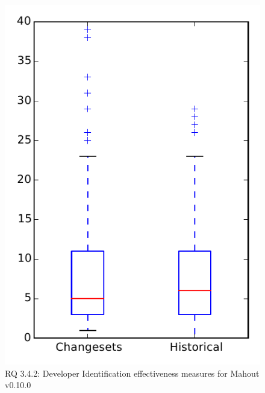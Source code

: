 
\begin{figure}
\centering
\includegraphics[height=0.4\textheight]{figures/dit/rq2_mahout}
\caption{RQ 3.4.2: Developer Identification effectiveness measures for Mahout v0.10.0}
\label{fig:dit:rq2:mahout}
\end{figure}
